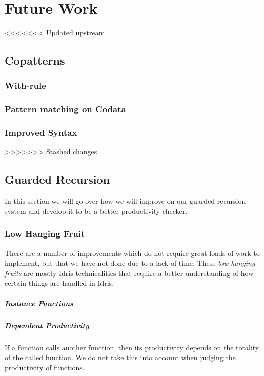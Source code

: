 \chapter{Future Work}
\label{cha:future-work}
<<<<<<< Updated upstream
=======
\section{Copatterns}
\subsection{With-rule}
\subsection{Pattern matching on Codata}
\subsection{Improved Syntax}
>>>>>>> Stashed changes
% 
\section{Guarded Recursion}
\label{sec:guarded-recursion-1}
In this section we will go over how we will improve on our guarded recursion
system and develop it to be a better productivity checker.
\subsection{Low Hanging Fruit}
There are a number of improvements which do not require great loads of work to
implement, but that we have not done due to a lack of time. These \emph{low
  hanging fruits} are mostly Idris technicalities that require a better
understanding of how certain things are handled in Idris.
\paragraph{Instance Functions}

\paragraph{Dependent Productivity}
If a function calls another function, then its productivity depends on the
totality of the called function. We do not take this into account when
judging the productivity of functions.

